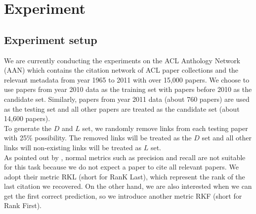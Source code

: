 \documentclass{article} %
\begin{document}
\section{Experiment} 
\subsection{Experiment setup}
We are currently conducting the experiments on the ACL Anthology Network (AAN) \cite{Radev&al.09,Radev&al.09a} which contains the citation network of ACL paper collections and the relevant metadata from year 1965 to 2011 with over 15,000 papers. We choose to use papers from year 2010 data as the training set with papers before 2010 as the candidate set. Similarly, papers from year 2011 data (about 760 papers) are used as the testing set and all other papers are treated as the candidate set (about 14,600 papers).\\
  To generate the $D$ and $L$ set, we randomly remove links from each testing paper with 25\% possibility. The removed links will be treated as the $D$ set and all other links will non-existing links will be treated as $L$ set.\\
As pointed out by \cite{nallapati2008joint}, normal metrics such as precision and recall are not suitable for this task because we do not expect a paper to cite all relevant papers. We adopt their metric RKL (short for RanK Last), which represent the rank of the last citation we recovered. On the other hand, we are also interested when we can get the first correct prediction, so we introduce another metric RKF (short for Rank First).
\end{document}
